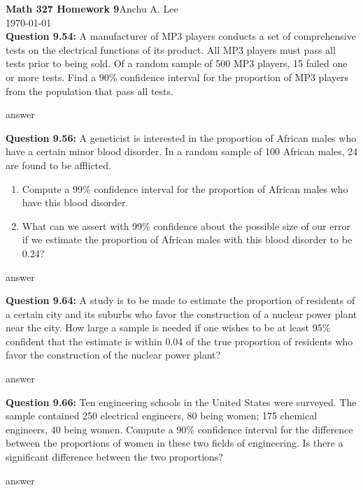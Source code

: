 \documentclass{article}
\begin{document}
\noindent\textbf{Math 327 Homework 9}\hfill Anchu A. Lee\\
\noindent\today\\\newline
\textbf{Question 9.54:}
A manufacturer of MP3 players conducts a set
of comprehensive tests on the electrical functions of its
product. All MP3 players must pass all tests prior to
being sold. Of a random sample of 500 MP3 players, 15
failed one or more tests. Find a 90\% confidence interval
for the proportion of MP3 players from the population
that pass all tests.
\begin{description}
    \item answer
\end{description}

\textbf{Question 9.56:}
A geneticist is interested in the proportion of
African males who have a certain minor blood disorder. 
In a random sample of 100 African males, 24 are
found to be afflicted.
\begin{enumerate}[label = (\alph*) ]
    \item Compute a 99\% confidence interval for the 
    proportion of African males who have this blood disorder.
    \item What can we assert with 99\% confidence about the
    possible size of our error if we estimate the 
    proportion of African males with this blood disorder to be
    0.24?
\end{enumerate}
\begin{description}
    \item answer
\end{description}

\textbf{Question 9.64:}
A study is to be made to estimate the proportion of 
residents of a certain city and its suburbs who
favor the construction of a nuclear power plant near
the city. How large a sample is needed if one wishes to
be at least 95\% confident that the estimate is within
0.04 of the true proportion of residents who favor the
construction of the nuclear power plant?
\begin{description}
    \item answer
\end{description}

\textbf{Question 9.66:}
Ten engineering schools in the United States
were surveyed. The sample contained 250 electrical
engineers, 80 being women; 175 chemical engineers, 40
being women. Compute a 90\% confidence interval for
the difference between the proportions of women in
these two fields of engineering. Is there a significant
difference between the two proportions?
\begin{description}
    \item answer
\end{description}
\end{document}
